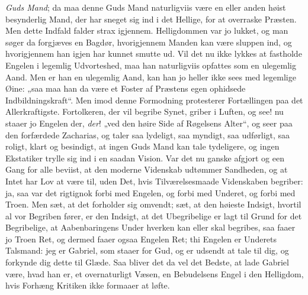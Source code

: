 \documentclass[12pt,a4paper]{book}
\begin{document}
\emph{Guds Mand}; da maa denne Guds Mand naturligviis være en eller
anden høist besynderlig Mand, der har sneget sig ind i det Hellige, for
at overraske Præsten. Men dette Indfald falder strax igjennem.
Helligdommen var jo lukket, og man søger da forgjæves en Bagdør,
hvorigjennem Manden kan være sluppen ind, og hvorigjennem han igjen har
kunnet smutte ud. Vil det nu ikke lykkes at fastholde Engelen i
legemlig Udvorteshed, maa han naturligviis opfattes som en ulegemlig
Aand. Men er han en ulegemlig Aand, kan han jo heller ikke sees med
legemlige Øine: „saa maa han da være et Foster af Præstens egen
ophidsede Indbildningskraft“. Men imod denne Formodning protesterer
Fortællingen paa det Allerkraftigste. Fortolkeren, der vil begribe
Synet, griber i Luften, og see! nu staaer jo Engelen der, \emph{der}!
„ved den høire Side af Røgelsens Alter“, og seer paa den forfærdede
Zacharias, og taler saa lydeligt, saa myndigt, saa udførligt, saa
roligt, klart og besindigt, at ingen Guds Mand kan tale tydeligere, og
ingen Ekstatiker trylle sig ind i en saadan Vision. Var det nu ganske
afgjort og een Gang for alle beviist, at den moderne Videnskab udtømmer
Sandheden, og at Intet har Lov at være til, uden Det, hvis
Tilværelsesmaade Videnskaben begriber: ja, saa var det rigtignok forbi
med Engelen, og forbi med Underet, og forbi med Troen. Men sæt, at det
forholder sig omvendt; sæt, at den høieste Indsigt, hvortil al vor
Begriben fører, er den Indsigt, at det Ubegribelige er lagt til Grund
for det Begribelige, at Aabenbaringens Under hverken kan eller skal
begribes, saa faaer jo Troen Ret, og dermed faaer ogsaa Engelen Ret;
thi Engelen er Underets Talsmand:
{\large jeg er Gabriel, som staaer for Gud, og er udsendt at
tale til dig, og forkynde dig dette til Glæde.} Saa bliver det da vel
det Bedste, at lade Gabriel være, hvad han er, et overnaturligt Væsen,
en Bebudelsens Engel i den Helligdom, hvis Forhæng Kritiken ikke
formaaer at løfte.
\end{document}
